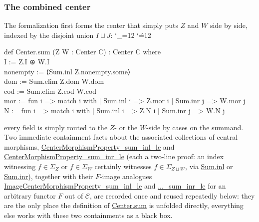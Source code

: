 \documentclass[11pt]{amsart}
\newcommand{\lc}[1]{\url{#1}}
\newenvironment{leancode}{%
  \begingroup
  \catcode`\_=12\relax
  \catcode`\^=12\relax
  \small\ttfamily\raggedright\baselineskip=1.15\baselineskip
  \par\smallskip\noindent
}{%
  \par\smallskip
  \endgroup
}
\theoremstyle{plain}
\theoremstyle{definition}
\theoremstyle{remark}
\newcommand{\calC}{\mathcal C}
\begin{document}
\subsubsection*{The combined center}
The formalization first forms the center that simply puts $Z$ and $W$ side by side, indexed
by the disjoint union $I \sqcup J$:
\begin{leancode}
def Center.sum (Z W : Center C) : Center C where \\
  I := Z.I ⊕ W.I \\
  nonempty := ⟨Sum.inl Z.nonempty.some⟩ \\
  dom := Sum.elim Z.dom W.dom \\
  cod := Sum.elim Z.cod W.cod \\
  mor := fun i => match i with | Sum.inl i => Z.mor i | Sum.inr j => W.mor j \\
  N   := fun i => match i with | Sum.inl i => Z.N i   | Sum.inr j => W.N j \\
\end{leancode}
every field is simply routed to the $Z$- or the $W$-side by cases on the summand. Two
immediate containment facts about the associated collections of central morphisms,
\lc{CenterMorphismProperty_sum_inl_le} and \lc{CenterMorphismProperty_sum_inr_le}
(each a two-line proof: an index witnessing $f \in \Sigma_Z$ or $f\in\Sigma_W$ certainly
witnesses $f \in \Sigma_{Z\sqcup W}$, via \lc{Sum.inl} or \lc{Sum.inr}), together with
their $F$-image analogues \lc{ImageCenterMorphismProperty_sum_inl_le} and
\lc{...\_sum_inr_le} for an arbitrary functor $F$ out of $\calC$, are recorded once and
reused repeatedly below: they are the only place the definition of \lc{Center.sum} is
unfolded directly, everything else works with these two containments as a black box.
\end{document}
